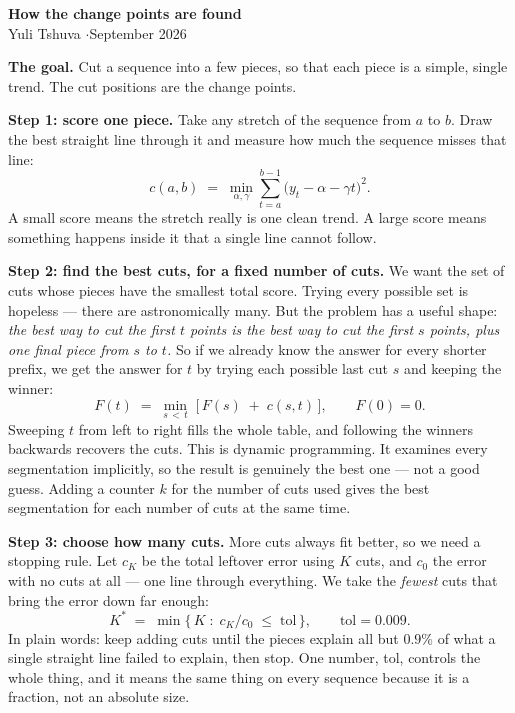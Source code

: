 \documentclass[11pt]{article}
\begin{document}
\begin{center}
{\Large \textbf{How the change points are found}}\\[2pt]
{\normalsize Yuli Tshuva \quad$\cdot$\quad September 2026}
\end{center}

\vspace{-2pt}

\textbf{The goal.} Cut a sequence into a few pieces, so that each piece is a
simple, single trend. The cut positions are the change points.

\textbf{Step 1: score one piece.} Take any stretch of the sequence from $a$ to
$b$. Draw the best straight line through it and measure how much the sequence
misses that line:
\[
c(a,b) \;=\; \min_{\alpha,\gamma} \sum_{t=a}^{b-1} \big( y_t - \alpha - \gamma t \big)^2 .
\]
A small score means the stretch really is one clean trend. A large score means
something happens inside it that a single line cannot follow.

\textbf{Step 2: find the best cuts, for a fixed number of cuts.} We want the set
of cuts whose pieces have the smallest total score. Trying every possible set is
hopeless --- there are astronomically many. But the problem has a useful shape:
\emph{the best way to cut the first $t$ points is the best way to cut the first
$s$ points, plus one final piece from $s$ to $t$.} So if we already know the
answer for every shorter prefix, we get the answer for $t$ by trying each
possible last cut $s$ and keeping the winner:
\[
F(t) \;=\; \min_{s\,<\,t} \; \Big[\, F(s) \;+\; c(s,t) \,\Big], \qquad F(0)=0 .
\]
Sweeping $t$ from left to right fills the whole table, and following the winners
backwards recovers the cuts. This is dynamic programming. It examines every
segmentation implicitly, so the result is genuinely the best one --- not a good
guess. Adding a counter $k$ for the number of cuts used gives the best
segmentation for each number of cuts at the same time.

\textbf{Step 3: choose how many cuts.} More cuts always fit better, so we need a
stopping rule. Let $c_K$ be the total leftover error using $K$ cuts, and $c_0$
the error with no cuts at all --- one line through everything. We take the
\emph{fewest} cuts that bring the error down far enough:
\[
K^\ast \;=\; \min \big\{\, K \;:\; c_K / c_0 \;\le\; \mathrm{tol} \,\big\},
\qquad \mathrm{tol} = 0.009 .
\]
In plain words: keep adding cuts until the pieces explain all but $0.9\%$ of
what a single straight line failed to explain, then stop. One number,
\textrm{tol}, controls the whole thing, and it means the same thing on every
sequence because it is a fraction, not an absolute size.
\end{document}
